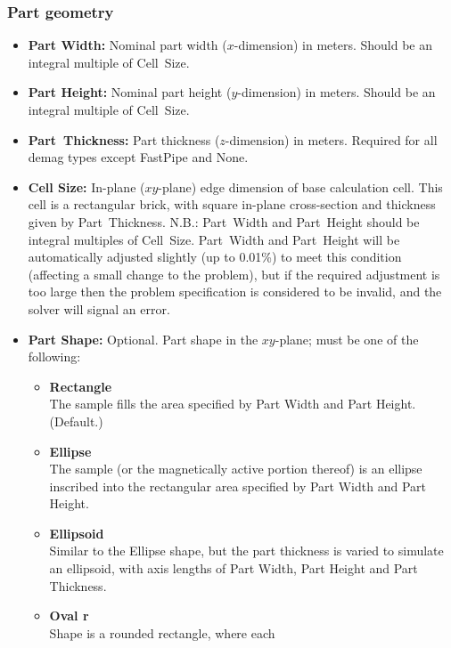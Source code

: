 \subsubsection{Part geometry}\label{sec:partgeometry}
\begin{itemize}
   \item {\bf Part Width:} Nominal part width ($x$-dimension) in
      meters.  Should be an integral multiple of Cell~Size.
   \item {\bf Part Height:} Nominal part height ($y$-dimension) in
      meters.  Should be an integral multiple of Cell~Size.
   \item {\bf Part~Thickness:} Part thickness ($z$-dimension) in meters.
      Required for all demag types except FastPipe and None.
   \item {\bf Cell Size:} In-plane ($xy$-plane) edge
      dimension of base calculation cell.  This cell is a rectangular
      brick, with square in-plane cross-section and thickness given by
      Part~Thickness.  N.B.: Part~Width and Part~Height should be
      integral multiples of Cell~Size.  Part~Width and Part~Height will
      be automatically adjusted slightly (up to 0.01\%) to meet this
      condition (affecting a small change to the problem), but if the
      required adjustment is too large then the problem specification is
      considered to be invalid, and the solver will signal an error.
   \item {\bf Part Shape:} Optional.  Part shape in the $xy$-plane;
      must be one of the following:
   \begin{itemize}
      \item {\bf Rectangle}\\
         The sample fills the area specified by Part Width and Part
         Height. (Default.) 
      \item {\bf Ellipse}\\
         The sample (or the magnetically active
         portion thereof) is an ellipse inscribed into the rectangular
         area specified by Part Width and Part Height.
      \item {\bf Ellipsoid}\\
         Similar to the Ellipse shape, but the part thickness is
         varied to simulate an ellipsoid, with axis lengths of
         Part Width, Part Height and Part Thickness.
      \item {\bf Oval r}\\
         Shape is a rounded rectangle, where each

\end{itemize}
\end{itemize}
